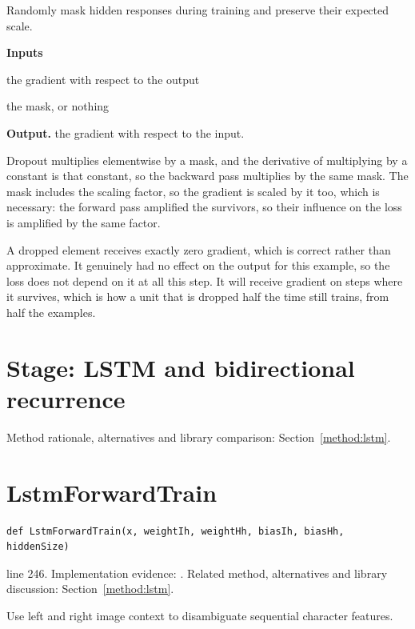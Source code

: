 Randomly mask hidden responses during training and preserve their expected scale.




\noindent\textbf{Inputs}
\begin{description}[leftmargin=2.2em,style=nextline,font=\normalfont\ttfamily]\setlength\itemsep{1pt}
  \item[{dout}] \normalfont the gradient with respect to the output
  \item[{cache}] \normalfont the mask, or nothing
\end{description}

\noindent\textbf{Output.} the gradient with respect to the input.


Dropout multiplies elementwise by a mask, and the derivative of multiplying by a constant is that constant, so the backward pass multiplies by the same mask. The mask includes the scaling factor, so the gradient is scaled by it too, which is necessary: the forward pass amplified the survivors, so their influence on the loss is amplified by the same factor.

A dropped element receives exactly zero gradient, which is correct rather than approximate. It genuinely had no effect on the output for this example, so the loss does not depend on it at all this step. It will receive gradient on steps where it survives, which is how a unit that is dropped half the time still trains, from half the examples.



\section*{Stage: LSTM and bidirectional recurrence}
Method rationale, alternatives and library comparison: Section~\ref{method:lstm}.
\section{LstmForwardTrain}\label{fn:train:LstmForwardTrain}
\begin{lstlisting}[style=sig]
def LstmForwardTrain(x, weightIh, weightHh, biasIh, biasHh, hiddenSize)
\end{lstlisting}
 line 246. Implementation evidence: \cite{code2026}. Related method, alternatives and library discussion: Section~\ref{method:lstm}.


Use left and right image context to disambiguate sequential character features.




